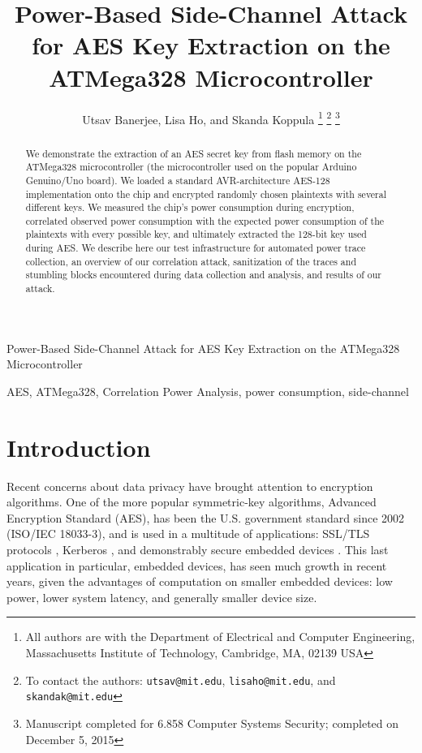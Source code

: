 \documentclass[journal]{ieee_style}
\begin{document}
\title{Power-Based Side-Channel Attack for AES Key Extraction on the ATMega328 Microcontroller}

\author{Utsav Banerjee,
        Lisa Ho,
        and Skanda Koppula%
\thanks{All authors are with the Department
of Electrical and Computer Engineering, Massachusetts Institute of Technology, Cambridge,
MA, 02139 USA}%
\thanks{To contact the authors: \texttt{utsav@mit.edu}, \texttt{lisaho@mit.edu}, and \texttt{skandak@mit.edu}}%
\thanks{Manuscript completed for 6.858 Computer Systems Security; completed on December 5, 2015}}

%
{Power-Based Side-Channel Attack for AES Key Extraction on the ATMega328 Microcontroller}
\maketitle

\begin{abstract}
    We demonstrate the extraction of an AES secret key from flash memory on the ATMega328 microcontroller (the microcontroller used on the popular Arduino Genuino/Uno board). We loaded a standard AVR-architecture AES-128 implementation onto the chip and encrypted randomly chosen plaintexts with several different keys. We measured the chip's power consumption during encryption, correlated observed power consumption with the expected power consumption of the plaintexts with every possible key, and ultimately extracted the 128-bit key used during AES. We describe here our test infrastructure for automated power trace collection, an overview of our correlation attack, sanitization of the traces and stumbling blocks encountered during data collection and analysis, and results of our attack.
\end{abstract}

\begin{IEEEkeywords}
AES, ATMega328, Correlation Power Analysis, power consumption, side-channel
\end{IEEEkeywords}

\section{Introduction}
Recent concerns about data privacy have brought attention to encryption algorithms. One of the more popular symmetric-key algorithms, Advanced Encryption Standard (AES), has been the U.S. government standard since 2002 (ISO/IEC 18033-3), and is used in a multitude of applications: SSL/TLS protocols \cite{ssl}, Kerberos \cite{kerberos}, and demonstrably secure embedded devices \cite{embedded}. This last application in particular, embedded devices, has seen much growth in recent years, given the advantages of computation on smaller embedded devices: low power, lower system latency, and generally smaller device size.
\end{document}

